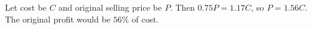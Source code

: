 Let cost be $C$ and original selling price be $P$. Then $0.75P=1.17C$, so $P=1.56C$. The original profit would be $\boxed{56\%}$ of cost.
